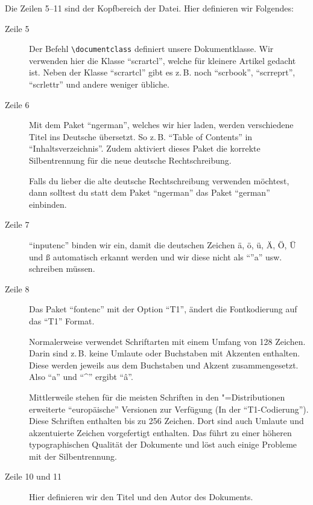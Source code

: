 Die Zeilen 5--11 sind der Kopfbereich der Datei. Hier definieren wir Folgendes:

\begin{description}
\item[Zeile 5] Der Befehl \texttt{\textbackslash documentclass} definiert unsere Dokumentklasse. Wir verwenden hier die Klasse \enquote{scrartcl}, welche für kleinere Artikel gedacht ist. Neben der \KOMAScript{} Klasse \enquote{scrartcl} gibt es z.\,B. noch \enquote{scrbook}, \enquote{scrreprt}, \enquote{scrlettr} und andere weniger übliche.
\item[Zeile 6] Mit dem Paket \enquote{ngerman}, welches wir hier laden, werden verschiedene Titel ins Deutsche übersetzt. So z.\,B. \enquote{Table of Contents} in \enquote{Inhaltsverzeichnis}. Zudem aktiviert dieses Paket die korrekte Silbentrennung für die neue deutsche Rechtschreibung.

Falls du lieber die alte deutsche Rechtschreibung verwenden möchtest, dann solltest du statt dem Paket \enquote{ngerman} das Paket \enquote{german} einbinden.
\item[Zeile 7] \enquote{inputenc} binden wir ein, damit die deutschen Zeichen ä, ö, ü, Ä, Ö, Ü und ß automatisch erkannt werden und wir diese nicht als \enquote{''a} usw. schreiben müssen.
\item[Zeile 8] Das Paket \enquote{fontenc} mit der Option \enquote{T1}, ändert die Fontkodierung auf das \enquote{T1} Format. %

Normalerweise verwendet \DMLLaTeX{} Schriftarten mit einem Umfang von 128 Zeichen. Darin sind z.\,B. keine Umlaute oder Buchstaben mit Akzenten enthalten. Diese werden jeweils aus dem Buchstaben und Akzent zusammengesetzt. Also \enquote{a} und \enquote{\textasciicircum} ergibt \enquote{â}.

Mittlerweile stehen für die meisten Schriften in den \DMLLaTeX"=Distributionen erweiterte \enquote{europäische} Versionen zur Verfügung (In der \enquote{T1-Codierung}). Diese Schriften enthalten bis zu 256 Zeichen. Dort sind auch Umlaute und akzentuierte Zeichen vorgefertigt enthalten. Das führt zu einer höheren typographischen Qualität der Dokumente und löst auch einige Probleme mit der Silbentrennung.
\item[Zeile 10 und 11] Hier definieren wir den Titel und den Autor des Dokuments.
\end{description}

